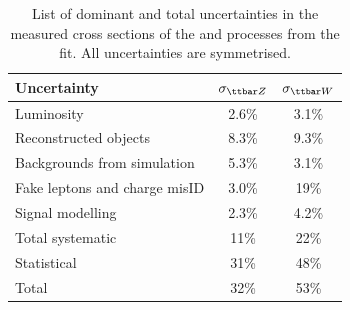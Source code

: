 \begin{table}[htbp]
\centering \renewcommand{\arraystretch}{1.2}
\caption{List of dominant and total uncertainties in the measured cross 
sections of the \ttZ and \ttW processes from the fit. All uncertainties are
symmetrised.\vspace{1ex}}
\label{tab:syst}
\begin{tabular}{lcc}
\toprule
Uncertainty                 &   $\sigma_{\ttZ}$ & $\sigma_{\ttW}$ \\
\midrule
Luminosity                    & 2.6\% & 3.1\%  \\
Reconstructed objects         & 8.3\% & 9.3\%  \\
Backgrounds from simulation   & 5.3\% & 3.1\%  \\
Fake leptons and charge misID & 3.0\% & 19\%  \\
Signal modelling   & 2.3\% & 4.2\%  \\
\midrule
Total systematic            & 11\% & 22\% \\
Statistical                 & 31\% & 48\% \\
\midrule
Total                       & 32\% & 53\% \\
\bottomrule
\end{tabular}
\end{table}
